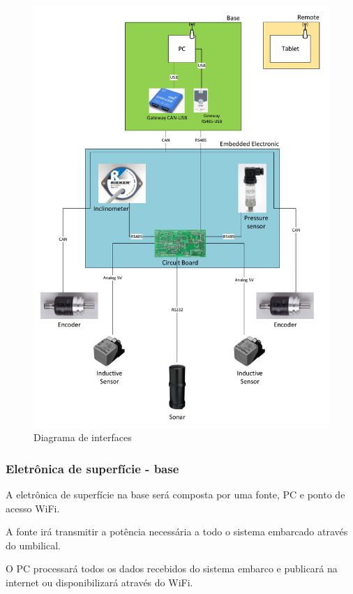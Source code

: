 \begin{figure}[H]
    \centering
    \includegraphics[width=1\columnwidth]{figs/EE/1.pdf}
    \caption{Diagrama de interfaces}
    \label{EE_1}
\end{figure}

\subsubsection{Eletrônica de superfície - base}
A eletrônica de superfície na base será composta por uma fonte, PC e ponto de
acesso WiFi.

A fonte irá transmitir a potência necessária a todo o sistema embarcado
através do umbilical.

O PC processará todos os dados recebidos do sistema embarco e publicará na
internet ou disponibilizará através do WiFi.

